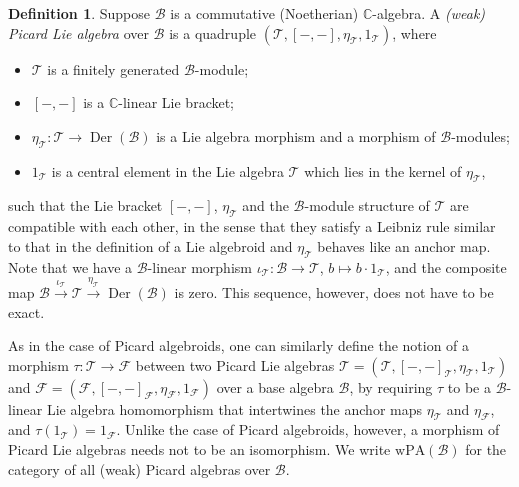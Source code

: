 \documentclass[12pt]{amsart}
\newcommand{\C}{\mathbb{C}}
\newcommand{\B}{\mathcal{B}}
\newcommand{\T}{\mathcal{T}}
\newcommand{\F}{\mathcal{F}}
\newcommand{\der}{{\operatorname{Der}}}
\theoremstyle{definition}
\newtheorem{defi}[Thm]{Definition}
\numberwithin{equation}{section}
\begin{document}
\begin{defi}
	Suppose $\B$ is a commutative (Noetherian) $\C$-algebra. A  {\it (weak) Picard Lie algebra} over $\B$ is a quadruple $(\T, [-,-], \eta_\T, 1_{\T})$, where
	\begin{itemize}
		\item
		$\T$ is a finitely generated $\B$-module;
		\item
		$[-,-]$ is a $\C$-linear Lie bracket;
		\item
		$\eta_\T: \T \to \der(\B)$ is a Lie algebra morphism and a morphism of $\B$-modules;
		\item
		$1_\T$ is a central element in the Lie algebra $\T$ which lies in the kernel of $\eta_\T$,
	\end{itemize}
	such that the Lie bracket $[-,-]$, $\eta_\T$ and the $\B$-module structure of $\T$ are compatible with each other, in the sense that they satisfy a Leibniz rule similar to that in the definition of a Lie algebroid and $\eta_\T$ behaves like an anchor map. Note that we have a $\B$-linear morphism $\iota_\T: \B \to \T$, $b \mapsto b \cdot 1_\T$, and the composite map $\B \xrightarrow{\iota_\T} \T \xrightarrow{\eta_\T} \der(\B)$ is zero. This sequence, however, does not have to be exact.
	
	As in the case of Picard algebroids, one can similarly define the notion of a morphism $\tau: \T \to \F$ between two Picard Lie algebras $\T=(\T, [-,-]_\T, \eta_\T, 1_{\T})$ and $\F=(\F, [-,-]_\F, \eta_\F, 1_{\F})$ over a base algebra $\B$, by requiring $\tau$ to be a $\B$-linear Lie algebra homomorphism that intertwines the anchor maps $\eta_\T$ and $\eta_{\F}$, and $\tau(1_\T)=1_\F$. Unlike the case of Picard algebroids, however, a morphism of Picard Lie algebras needs not to be an isomorphism. We write $\mathrm{wPA}(\B)$ for the category of all (weak) Picard algebras over $\B$.
\end{defi}
\end{document}
